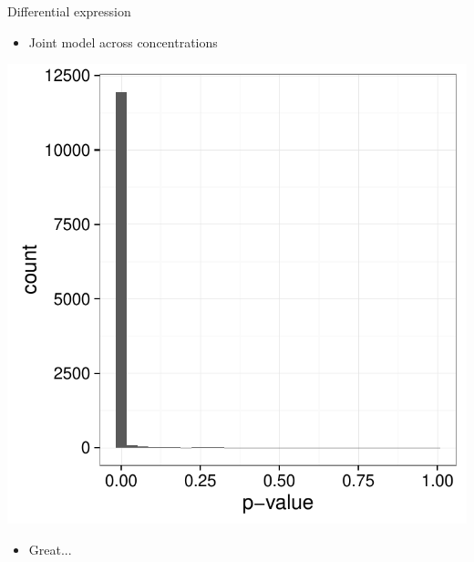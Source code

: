 \documentclass{beamer}
\begin{document}
\begin{frame}{Differential expression}
\begin{itemize}
\item Joint model across concentrations
\end{itemize}
\centering
\includegraphics[width=.6\textwidth,clip,trim=0 0 0 0]{../figures/de_boring.pdf}
\begin{itemize}
\item Great... 
\end{itemize}
\end{frame}
\end{document}
